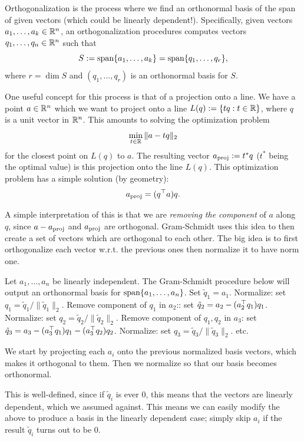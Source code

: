 \documentclass[11 pt]{scrartcl}
\begin{document}
Orthogonalization is the process where we find an orthonormal basis of the span of given vectors (which could be linearly dependent!). 
Specifically, given vectors $a_1, \dots, a_k\in \mathbb R^n$, an orthogonalization procedures computes vectors $q_1, \dots, q_n\in \mathbb R^n$ such that 
\[ S:= \text{span} \{a_1, \dots, a_k\} = \text{span}\{q_1,\dots,q_r\},\] 
where $r = \dim S$ and $(q_1, \dots, q_r)$ is an orthonormal basis for $S$. 

One useful concept for this process is that of a projection onto a line. 
We have a point $a\in \mathbb R^n$ which we want to project onto a line $L(q) := \{tq : t\in \mathbb R\}$, where $q$ is a unit vector in $\mathbb R^n$. 
This amounts to solving the optimization problem 
\[ \min_{t\in \mathbb R} \|a-tq\|_2\] 
for the closest point on $L(q)$ to $a$. 
The resulting vector $a_{\text{proj}} := t^* q$ ($t^*$ being the optimal value) is this projection onto the line $L(q)$. 
This optimization problem has a simple solution (by geometry):
\[ a_{\text{proj}} = (q^\top a) q.\] 

A simple interpretation of this is that we are \emph{removing the component} of $a$ along $q$, since $a-a_{\text{proj}}$ and $a_{\text{proj}}$ are orthogonal. 
Gram-Schmidt uses this idea to then create a set of vectors which are orthogonal to each other. 
The big idea is to first orthogonalize each vector w.r.t. the previous ones then normalize it to have norm one. 

\begin{theorem}
    Let $a_1, \dots, a_n$ be linearly independent. 
    The Gram-Schmidt procedure below will output an orthonormal basis for $\text{span}\{a_1, \dots, a_n\}$. 
    \itemnum
        \ii Set $\tilde{q}_1 = a_1$. 
        \ii Normalize: set $q_1 = \tilde{q}_1/\|\tilde{q}_1\|_2.$
        \ii Remove component of $q_1$ in $a_2$:: set $\tilde{q}_2 = a_2 - (a_2^\top q_1) q_1$. 
        \ii Normalize: set $q_2 = \tilde{q}_2/\|\tilde{q}_2\|_2$. 
        \ii Remove component of $q_1, q_2$ in $a_3$: set $\tilde{q}_3 = a_3 - (a_3^\top q_1)q_1 - (a_3^\top q_2)q_2$. 
        \ii Normalize: set $q_3 = \tilde{q}_3/\|\tilde{q}_3\|_2$. 
        \ii etc.
    \itemend
\end{theorem}

We start by projecting each $a_i$ onto the previous normalized basis vectors, which makes it orthogonal to them. 
Then we normalize so that our basis becomes orthonormal.

This is well-defined, since if $\tilde{q}_i$ is ever 0, this means that the vectors are linearly dependent, which we assumed against. 
This means we can easily modify the above to produce a basis in the linearly dependent case; simply skip $a_i$ if the result $\tilde{q}_i$ turns out to be 0. 
\end{document}

